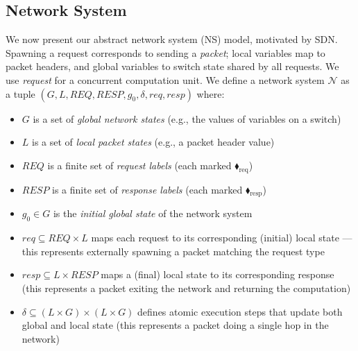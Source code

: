 \subsection{Network System}    
We now present our abstract network system (NS) model, motivated by SDN. Spawning a request corresponds to sending a \emph{packet}; local variables map to packet headers, and global variables to switch state shared by all requests. We use \emph{request} for a concurrent computation unit.
%
We define a network system $\mathcal{N}$ as a tuple $(G, L, \mathit{REQ},  \mathit{RESP}, g_0, \delta, \mathit{req}, \mathit{resp})$ where:
\begin{itemize}
\item $G$ is a set of \textit{global network states} (e.g., the values of variables on a switch)

\item $L$ is a set of \textit{local packet states} (e.g., a packet header value)

\item $\mathit{REQ}$ is a finite set of \textit{request labels} (each marked {\color{ForestGreen}$\blacklozenge_\text{req}$})

\item $\mathit{RESP}$ is a finite set of \textit{response labels} (each marked {\color{red}$\blacklozenge_\text{resp}$})

\item $g_0 \in G$ is the \textit{initial global state} of the network system

\item $\mathit{req} \subseteq \mathit{REQ} \times  L$ maps each request to its corresponding (initial) local state --- this represents externally spawning a packet matching the request type

\item $\mathit{resp} \subseteq L \times \mathit{RESP}$ maps a (final) local state to its corresponding response (this represents a packet exiting the network and returning the computation)

\item $\delta \subseteq  (L \times G) \times ( L \times G)$ defines atomic execution steps that update both global and local state (this represents a packet doing a single hop in the network)
\end{itemize}


